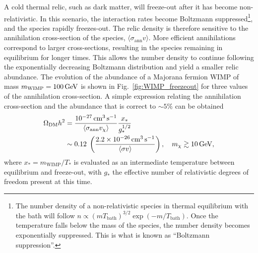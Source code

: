 A cold thermal relic, such as dark matter, will freeze-out after it has become non-relativistic. In this scenario, the interaction rates become Boltzmann suppressed\footnote{The number density of a non-relativistic species in thermal equilibrium with the bath will follow $n \propto \left(m T_\mathrm{bath}\right)^{3/2} \exp\left(-m /T_\mathrm{bath}\right)$. Once the temperature falls below the mass of the species, the number density becomes exponentially suppressed. This is what is known as ``Boltzmann suppression''.}, and the species rapidly freezes-out. The relic density is therefore sensitive to the annihilation cross-section of the species, $\langle \sigma_\mathrm{ann} v\rangle$. More efficient annihilations correspond to larger cross-sections, resulting in the species remaining in equilibrium for longer times. This allows the number density to continue following the exponentially decreasing Boltzmann distribution and yield a smaller relic abundance. The evolution of the abundance of a Majorana fermion WIMP of mass $m_\mathrm{WIMP} = 100{\rm \,GeV}$ is shown in Fig.~\ref{fig:WIMP_freezeout} for three values of the annihilation cross-section. A simple expression  relating the annihilation cross-section and the abundance that is correct to $\sim5\%$ can be obtained~\cite{Steigman:2012nb_PreciseRelicWIMP} 
\begin{align}
    \Omega_{\mathrm{DM}}h^2 & = \frac{10^{-27}{\rm \,cm}^3{\rm \,s}^{-1}}{\langle \sigma_{\rm ann} v_\chi \rangle} \frac{x_*}{g_*^{1/2}}\\
     &\sim 0.12 \; \left(\frac{2.2\times 10^{-26}{\rm \,cm}^3 {\rm \,s}^{-1}}{\langle \sigma v\rangle}\right),\quad m_\chi\gtrsim 10{\rm \,GeV},
\end{align}
where $x_* = m_\mathrm{WIMP}/T_*$ is evaluated as an intermediate temperature between equilibrium and freeze-out, with $g_*$ the effective number of relativistic degrees of freedom present at this time. 

